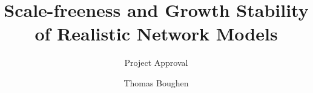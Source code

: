 \documentclass[
]{article}
\title{Scale-freeness and Growth Stability of Realistic Network Models}
\subtitle{Project Approval}
\author{Thomas Boughen}
\date{}
\begin{document}


\begin{titlepage}


\newcommand{\titlepagepagealign}{
\ifthenelse{\equal{center}{right}}{\raggedleft}{}
\ifthenelse{\equal{center}{center}}{\centering}{}
\ifthenelse{\equal{center}{left}}{\raggedright}{}
}


\newcommand{\titleandsubtitle}{
{{\Huge{\textbf{\nohyphens{Scale-freeness and Growth Stability of
Realistic Network Models}}}}\par
}%

\vspace{\betweentitlesubtitle}
{
{\LARGE{\nohyphens{Project Approval}}}\par
}}
\newcommand{\titlepagetitleblock}{
\titleandsubtitle
}

\newcommand{\authorstyle}[1]{{\textbf{#1}}}

\newcommand{\affiliationstyle}[1]{{\large{#1}}}

\newcommand{\titlepageauthorblock}{
{\authorstyle{\nohyphens{Thomas Boughen}\\}}
}

\newcommand{\titlepageaffiliationblock}{
\hangindent=1em
\hangafter=1
{\affiliationstyle{


\vspace{1\baselineskip} 
}}
}
\newcommand{\headerstyled}{%
{}
}
\newcommand{\footerstyled}{%
{\Large{\textsc{Newcastle University 2023}}}
}
\newcommand{\datestyled}{%
{}
}


\newcommand{\titlepageheaderblock}{\headerstyled}

\newcommand{\titlepagefooterblock}{
\footerstyled
}

\newcommand{\titlepagedateblock}{
\datestyled
}

\newcommand{\titleblock}{\newlength{\betweentitlesubtitle}
\setlength{\betweentitlesubtitle}{0.5cm}
{

{\titlepagetitleblock}
}

\vspace{1.5cm}
}

\newcommand{\authorblock}{{\titlepageauthorblock}

\vspace{2\baselineskip}
}

\newcommand{\affiliationblock}{{\titlepageaffiliationblock}

}
\end{titlepage}
\end{document}
